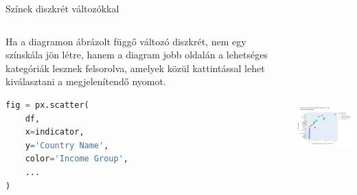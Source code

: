 \documentclass[english, aspectratio=169]{beamer}
\begin{document}
\begin{frame}[fragile]{Színek diszkrét változókkal}
	\begin{columns}
		\begin{column}{.5\textwidth}
			Ha a diagramon ábrázolt függő változó diszkrét, nem egy színskála jön létre, hanem a diagram jobb oldalán a lehetséges kategóriák lesznek felsorolva, amelyek közül kattintással lehet kiválasztani a megjelenítendő nyomot.\par\medskip
			\begin{lstlisting}[language=python]
fig = px.scatter(
	df,
	x=indicator,
	y='Country Name',
	color='Income Group',
	...
)				
			\end{lstlisting}
		\end{column}
		\begin{column}{.5\textwidth}
			\begin{center}
				\includegraphics[width=7cm, height=7cm, keepaspectratio]{images/scatter_11.png}
			\end{center}
		\end{column}
	\end{columns}
\end{frame}
\end{document}

